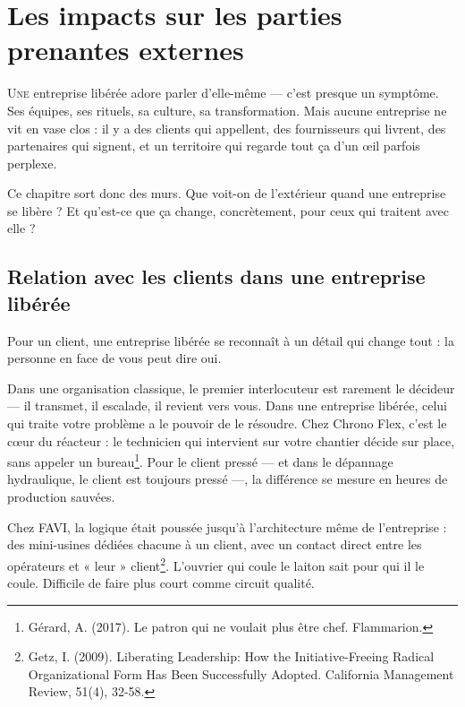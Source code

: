 
\chapter{Les impacts sur les parties prenantes externes}

\lettrine[lines=2]{U}{ne} entreprise libérée adore parler d'elle-même — c'est presque un symptôme. Ses équipes, ses rituels, sa culture, sa transformation. Mais aucune entreprise ne vit en vase clos : il y a des clients qui appellent, des fournisseurs qui livrent, des partenaires qui signent, et un territoire qui regarde tout ça d'un œil parfois perplexe.

Ce chapitre sort donc des murs. Que voit-on de l'extérieur quand une entreprise se libère ? Et qu'est-ce que ça change, concrètement, pour ceux qui traitent avec elle ?

\section{Relation avec les clients dans une entreprise libérée}

Pour un client, une entreprise libérée se reconnaît à un détail qui change tout : la personne en face de vous peut dire oui.

Dans une organisation classique, le premier interlocuteur est rarement le décideur — il transmet, il escalade, il revient vers vous. Dans une entreprise libérée, celui qui traite votre problème a le pouvoir de le résoudre. Chez Chrono Flex, c'est le cœur du réacteur : le technicien qui intervient sur votre chantier décide sur place, sans appeler un bureau\footnote{Gérard, A. (2017). Le patron qui ne voulait plus être chef. Flammarion.}. Pour le client pressé — et dans le dépannage hydraulique, le client est toujours pressé —, la différence se mesure en heures de production sauvées.

Chez FAVI, la logique était poussée jusqu'à l'architecture même de l'entreprise : des mini-usines dédiées chacune à un client, avec un contact direct entre les opérateurs et « leur » client\footnote{Getz, I. (2009). Liberating Leadership: How the Initiative-Freeing Radical Organizational Form Has Been Successfully Adopted. California Management Review, 51(4), 32-58.}. L'ouvrier qui coule le laiton sait pour qui il le coule. Difficile de faire plus court comme circuit qualité.

